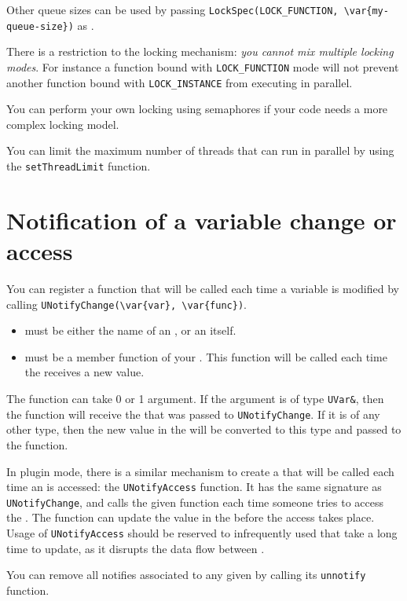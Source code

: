 Other queue sizes can be used by passing
\lstinline|LockSpec(LOCK_FUNCTION, \var{my-queue-size})| as .

There is a restriction to the locking mechanism: \emph{you cannot mix
  multiple locking modes}.  For instance a function bound with
\lstinline{LOCK_FUNCTION} mode will not prevent another function bound with
\lstinline{LOCK_INSTANCE} from executing in parallel.

You can perform your own locking using semaphores if your code needs a more
complex locking model.

You can limit the maximum number of threads that can run in parallel by using
the \lstinline{setThreadLimit} function.

\section{Notification of a variable change or access}
\label{sec:uobject:uvar-notify}
You can register a function that will be called each time a variable is
modified by calling \lstinline|UNotifyChange(\var{var}, \var{func})|.

\begin{itemize}
\item {} must be either the name of an \UVar, or an \UVar itself.
\item {} must be a member function of your \UObject. This function
will be called each time the \UVar receives a new value.
\end{itemize}

The function can take 0 or 1 argument. If the argument is of type
\lstinline{UVar&}, then the function will receive the \UVar that was passed to
\lstinline{UNotifyChange}. If it is of any other type, then the new value in the
\UVar will be converted to this type and passed to the function.

In plugin mode, there is a similar mechanism to create a  that will be called each time an \UVar is accessed: the
\lstinline{UNotifyAccess} function. It has the same signature as
\lstinline{UNotifyChange}, and calls the given function each time someone
tries to access the \UVar. The function can update the value in the \UVar
before the access takes place. Usage of \lstinline{UNotifyAccess} should be
reserved to infrequently used \UVar that take a long time to update, as it
disrupts the data flow between \UObject.


You can remove all notifies associated to any given \UVar by calling its
\lstinline{unnotify} function.


